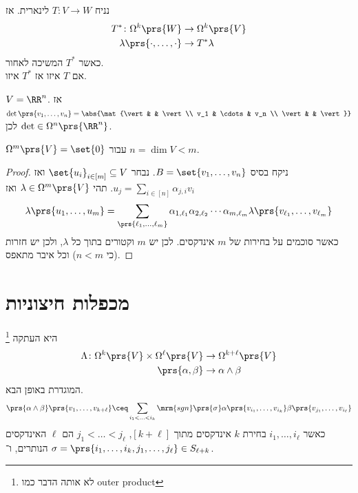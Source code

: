 \documentclass[a4paper,10pt,twoside,openany]{book}
\begin{document}
נניח
$T \colon V \to W$
לינארית. אז
\begin{align*}
T^* \colon \Omega^k\prs{W} &\to \Omega^k\prs{V} \\
\lambda\prs{\cdot, \ldots, \cdot} &\to T^* \lambda
\end{align*}
כאשר
$T^*$
המשיכה לאחור.
\\
אם
$T$
איזו אז
$T^*$
איזו.

\begin{example}
$V = \RR^n$.
אז
$\det \prs{v_1, \ldots, v_n} = \abs{\mat{\vert & & \vert \\ v_1 & \cdots & v_n \\ \vert & & \vert}}$
לכן
$\det \in \Omega^n\prs{\RR^n}$.
\end{example}
\begin{proposition}
$\Omega^m \prs{V} = \set{0}$
עבור
$n = \dim V < m$.
\end{proposition}
\begin{proof}
ניקח בסיס
$B = \set{v_1, \ldots, v_n}$.
נבחר
$\set{u_i}_{i\in [m]} \subseteq V$
ואז
$u_j = \sum_{i\in [n]} \alpha_{j,i} v_i$.
תהי
$\lambda \in \Omega^m \prs{V}$
ואז
\[\lambda\prs{u_1, \ldots, u_m} = \sum_{\prs{\ell_1, \ldots, \ell_m}} \alpha_{1,\ell_1} \alpha_{2,\ell_2} \cdots \alpha_{m,\ell_m} \lambda\prs{v_{\ell_1}, \ldots, v_{\ell_m}}\]
כאשר סוכמים על בחירות של
$m$
אינדקסים.
לכן יש
$m$
וקטורים בתוך כל
$\lambda$,
ולכן יש חזרות (כי
$n < m$)
וכל איבר מתאפס.
\end{proof}
\section{מכפלות חיצוניות}
\begin{definition}
\footnote{לא אותה הדבר כמו
\textenglish{outer product}}
היא העתקה
\begin{align*}
\Lambda \colon \Omega^k\prs{V} \times \Omega^{\ell}\prs{V} &\to \Omega^{k+\ell}\prs{V} \\
\prs{\alpha, \beta} &\to \alpha \wedge \beta
\end{align*}
המוגדרת באופן הבא.
\begin{align*}
\prs{\alpha \wedge \beta}\prs{v_1,\ldots, v_{k+\ell}} \ceq  \sum_{i_1 < \ldots < i_k} \mrm{sgn}\prs{\sigma} \alpha\prs{v_{i_1}, \ldots, v_{i_k}} \beta\prs{v_{j_1}, \ldots, v_{i_{\ell}}}
\end{align*}
כאשר
$i_1, \ldots, i_{\ell}$
בחירת
$k$
אינדקסים מתוך
$[k+\ell]$,
$j_1 < \ldots < j_{\ell}$
הם
$\ell$
האינדקסים הנותרים, ו־%
$\sigma = \prs{i_1, \ldots, i_k, j_1, \ldots, j_{\ell}} \in S_{\ell+k}$.
\end{definition}
\end{document}
